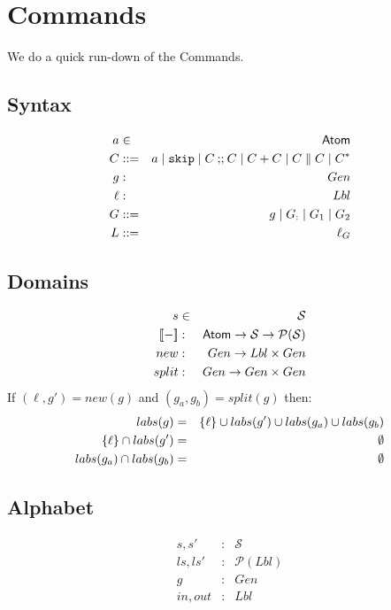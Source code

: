 \section{Commands}

We do a quick run-down of the Commands\cite{conf/popl/Dinsdale-YoungBGPY13}.

\subsection{Syntax}

\begin{eqnarray*}
   a &\in& \textsf{Atom}
\\ C &::=& a \mid \texttt{skip} \mid C \mathbin{;\!;} C \mid C+C \mid C \parallel C \mid C^*
\\ g &:& Gen
\\ \ell &:& Lbl
\\ G &::=&  g \mid G_{:} \mid G_1 \mid G_2
\\ L &::=& \ell_G
\end{eqnarray*}

\subsection{Domains}
\begin{eqnarray*}
   s &\in& \mathcal S
\\ \sem{-} &:& \Atom \fun \mathcal S \fun \mathcal P(\mathcal S)
\\ new &:& Gen \fun Lbl \times Gen
\\ split &:& Gen\fun Gen \times Gen
\end{eqnarray*}
If $(\ell,g') = new(g)$ and $(g_a,g_b) = split(g)$ then:
\begin{eqnarray*}
   labs(g) &=& \{{\ell}\} \cup labs(g') \cup labs(g_a) \cup labs (g_b)
\\ \{{\ell}\} \cap labs(g') &=& \emptyset
\\ labs(g_a) \cap labs(g_b) &=& \emptyset
\end{eqnarray*}

\subsection{Alphabet}

\begin{eqnarray*}
   s, s' &:& \mathcal S
\\ ls, ls' &:& \mathcal P (Lbl)
\\ g &:& Gen
\\ in, out &:& Lbl
\end{eqnarray*}

